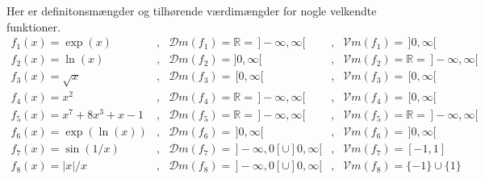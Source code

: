 \begin{example} \label{tn14.exampElemDV}
Her er  definitonsmængder og tilhørende værdimængder for nogle velkendte funktioner.
\begin{equation}
\begin{array}{lllll}
  f_{1}(x) = \exp(x) & , & \mathcal{D}m(f_{1}) = \mathbb{R} = \, ]- \infty, \infty[  & , & \mathcal{V}m(f_{1}) = \,]0, \infty[ \\
  f_{2}(x) = \ln(x) & , & \mathcal{D}m(f_{2}) =  ]0, \infty[  & , & \mathcal{V}m(f_{2}) = \mathbb{R} = \, ]- \infty, \infty[  \\
  f_{3}(x) = \sqrt{x} & , & \mathcal{D}m(f_{3}) = \, [0, \infty[  & , & \mathcal{V}m(f_{3}) = \,[0, \infty[ \\
  f_{4}(x) = x^{2} & , & \mathcal{D}m(f_{4}) = \mathbb{R} = \, ]- \infty, \infty[  & , & \mathcal{V}m(f_{4}) = \,[0, \infty[ \\
  f_{5}(x) = x^{7}+ 8x^{3} + x -1 & , & \mathcal{D}m(f_{5}) = \mathbb{R} = \, ]- \infty, \infty[  & , & \mathcal{V}m(f_{5}) = \mathbb{R} = \, ]- \infty, \infty[ \\
  f_{6}(x) = \exp(\ln(x))& , & \mathcal{D}m(f_{6}) =  \, ]0, \infty[  & , & \mathcal{V}m(f_{6}) = \, ]0, \infty[  \\
  f_{7}(x) = \sin(1/x) & , & \mathcal{D}m(f_{7}) = \, ]- \infty, 0[ \cup ]0, \infty[  & , & \mathcal{V}m(f_{7}) = [-1, 1]\\
  f_{8}(x) = |x|/x & , & \mathcal{D}m(f_{8}) = \, ]- \infty, 0[ \cup ]0, \infty[  & , & \mathcal{V}m(f_{8}) = \{-1\} \cup \{1\} \\
\end{array}
\end{equation}
\end{example}


